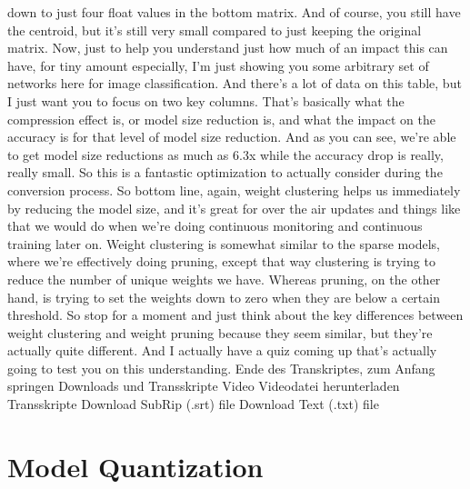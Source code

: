 {{{{{    down to just four float values in the bottom matrix.
    And of course, you still have the centroid,
    but it's still very small compared to just keeping the original matrix.
    Now, just to help you understand just how much of an impact this can have,
    for tiny amount especially, I'm just showing you
    some arbitrary set of networks here for image classification.
    And there's a lot of data on this table, but I just
    want you to focus on two key columns.
    That's basically what the compression effect is, or model size reduction is,
    and what the impact on the accuracy is for that level of model size reduction.
    And as you can see, we're able to get model size reductions as much as 6.3x
    while the accuracy drop is really, really small.
    So this is a fantastic optimization to actually consider
    during the conversion process.
    So bottom line, again, weight clustering helps us
    immediately by reducing the model size, and it's great
    for over the air updates and things like that we
    would do when we're doing continuous monitoring and continuous training
    later on.
    Weight clustering is somewhat similar to the sparse models, where
    we're effectively doing pruning, except that way
    clustering is trying to reduce the number of unique weights we have.
    Whereas pruning, on the other hand, is trying to set the weights down to zero
    when they are below a certain threshold.
    So stop for a moment and just think about the key differences
    between weight clustering and weight pruning because they seem similar,
    but they're actually quite different.
    And I actually have a quiz coming up that's actually going
    to test you on this understanding.
    Ende des Transkriptes, zum Anfang springen
    Downloads und Transskripte
    Video
    Videodatei herunterladen
    Transskripte
    Download SubRip (.srt) file
    Download Text (.txt) file

\section{Model Quantization}

}}}}}
